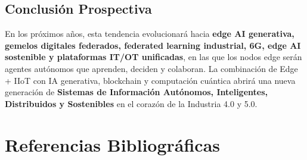 ﻿\documentclass[12pt,a4paper,oneside]{article}
\begin{document}
\subsection{Conclusión Prospectiva}

En los próximos años, esta tendencia evolucionará hacia \textbf{edge AI generativa, gemelos digitales federados, federated learning industrial, 6G, edge AI sostenible y plataformas IT/OT unificadas}, en las que los nodos edge serán agentes autónomos que aprenden, deciden y colaboran. La combinación de Edge + IIoT con IA generativa, blockchain y computación cuántica abrirá una nueva generación de \textbf{Sistemas de Información Autónomos, Inteligentes, Distribuidos y Sostenibles} en el corazón de la Industria 4.0 y 5.0.

\section{Referencias Bibliográficas}

\nocite{*}
\printbibliography[title={Referencias}]
\end{document}
